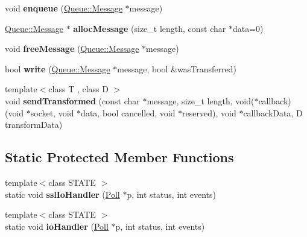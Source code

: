 \begin{DoxyCompactItemize}
void {\bfseries enqueue} (\mbox{\hyperlink{structu_s_1_1_socket_1_1_queue_1_1_message}{Queue\+::\+Message}} $\ast$message)
\item 
\mbox{\label{structu_s_1_1_socket_af3cccd4b155509ecbfdb6ebd5ad67f55}} 
\mbox{\hyperlink{structu_s_1_1_socket_1_1_queue_1_1_message}{Queue\+::\+Message}} $\ast$ {\bfseries alloc\+Message} (size\+\_\+t length, const char $\ast$data=0)
\item 
\mbox{\label{structu_s_1_1_socket_a5e3d88792f59e861f61081eced2a77d3}} 
void {\bfseries free\+Message} (\mbox{\hyperlink{structu_s_1_1_socket_1_1_queue_1_1_message}{Queue\+::\+Message}} $\ast$message)
\item 
\mbox{\label{structu_s_1_1_socket_ad5ef4e37198b1356fe1ad5deb5d66f1f}} 
bool {\bfseries write} (\mbox{\hyperlink{structu_s_1_1_socket_1_1_queue_1_1_message}{Queue\+::\+Message}} $\ast$message, bool \&was\+Transferred)
\item 
\mbox{\label{structu_s_1_1_socket_ab000a9d579baac719182074100133c21}} 
{\footnotesize template$<$class T , class D $>$ }\\void {\bfseries send\+Transformed} (const char $\ast$message, size\+\_\+t length, void($\ast$callback)(void $\ast$socket, void $\ast$data, bool cancelled, void $\ast$reserved), void $\ast$callback\+Data, D transform\+Data)
\end{DoxyCompactItemize}
\subsection*{Static Protected Member Functions}
\begin{DoxyCompactItemize}
\item 
\mbox{\label{structu_s_1_1_socket_aef1048dff6be13161695c1752e7a04b6}} 
{\footnotesize template$<$class S\+T\+A\+TE $>$ }\\static void {\bfseries ssl\+Io\+Handler} (\mbox{\hyperlink{struct_poll}{Poll}} $\ast$p, int status, int events)
\item 
\mbox{\label{structu_s_1_1_socket_a72efcc8bb407e6f313b6a14e7beaee62}} 
{\footnotesize template$<$class S\+T\+A\+TE $>$ }\\static void {\bfseries io\+Handler} (\mbox{\hyperlink{struct_poll}{Poll}} $\ast$p, int status, int events)
\end{DoxyCompactItemize}
